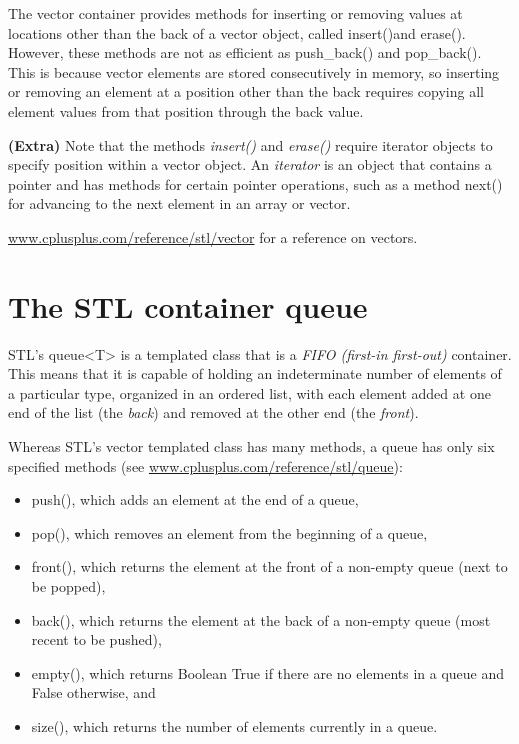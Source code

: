 \documentclass[letterpaper,10pt,openany,oneside]{sphinxmanual}
\begin{document}
The vector container provides methods for inserting or removing
values at locations other than the back of a vector object, called
insert()and erase(). However, these methods are not as efficient as
push\_back() and pop\_back(). This is because vector elements are stored
consecutively in memory, so inserting or removing an element at a
position other than the back requires copying all element values from
that position through the back value.

\textbf{(Extra)} Note that the methods \emph{insert()} and \emph{erase()}
require iterator objects to specify position within a vector object. An
\emph{iterator} is an object that contains a pointer and has methods for
certain pointer operations, such as a method next() for advancing to the
next element in an array or vector.




\href{http://www.cplusplus.com/reference/stl/vector}{www.cplusplus.com/reference/stl/vector} for a reference on vectors.




\section{The STL container queue}
\label{IntroSTLContainers/introduction_stl_containers:the-stl-container-queue}
STL's queue\textless{}T\textgreater{} is a templated class that is a \emph{FIFO (first-in
first-out)} container. This means that it is capable of holding an
indeterminate number of elements of a particular type, organized in an
ordered list, with each element added at one end of the list (the
\emph{back}) and removed at the other end (the \emph{front}).

Whereas STL's vector templated class has many methods, a queue
has only six specified methods
(see \href{http://www.cplusplus.com/reference/stl/queue}{www.cplusplus.com/reference/stl/queue}):
\begin{itemize}
\item {} 
push(), which adds an element at the end of a queue,

\item {} 
pop(), which removes an element from the beginning of a queue,

\item {} 
front(), which returns the element at the front of a non-empty queue (next to be popped),

\item {} 
back(), which returns the element at the back of a non-empty queue (most recent to be pushed),

\item {} 
empty(), which returns Boolean True if there are no elements in a queue and False otherwise, and

\item {} 
size(), which returns the number of elements currently in a queue.

\end{itemize}
\end{document}
